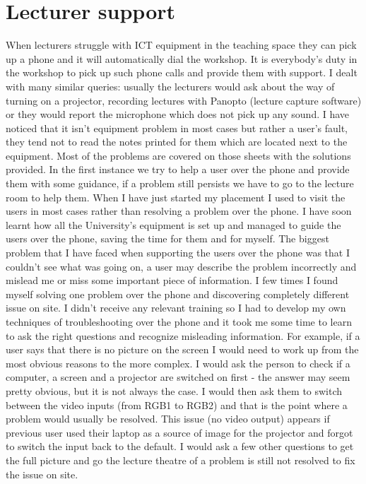 \documentclass[10pt,a4paper,headinclude=true]{report}
\begin{document}
\section{Lecturer support}
When lecturers struggle with ICT equipment in the teaching space they can pick up a phone and it will automatically dial the workshop. It is everybody's duty in the workshop to pick up such phone calls and provide them with support. I dealt with many similar queries: usually the lecturers would ask about the way of turning on a projector, recording lectures with Panopto (lecture capture software) or they would report the microphone which does not pick up any sound. I have noticed that it isn't equipment problem in most cases but rather a user's fault, they tend not to read the notes printed for them which are located next to the equipment. Most of the problems are covered on those sheets with the solutions provided. In the first instance we try to help a user over the phone and provide them with some guidance, if a problem still persists we have to go to the lecture room to help them. When I have just started my placement I used to visit the users in most cases rather than resolving a problem over the phone. I have soon learnt how all the University's equipment is set up and managed to guide the users over the phone, saving the time for them and for myself. The biggest problem that I have faced when supporting the users over the phone was that I couldn't see what was going on, a user may describe the problem incorrectly and mislead me or miss some important piece of information. I few times I found myself solving one problem over the phone and discovering completely different issue on site. I didn't receive any relevant training so I had to develop my own techniques of troubleshooting over the phone and it took me some time to learn to ask the right questions and recognize misleading information. For example, if a user says that there is no picture on the screen I would need to work up from the most obvious reasons to the more complex. I would ask the person to check if a computer, a screen and a projector are switched on first - the answer may seem pretty obvious, but it is not always the case. I would then ask them to switch between the video inputs (from RGB1 to RGB2) and that is the point where a problem would usually be resolved. This issue (no video output) appears if previous user used their laptop as a source of image for the projector and forgot to switch the input back to the default. I would ask a few other questions to get the full picture and go the lecture theatre of a problem is still not resolved to fix the issue on site.
\end{document}
